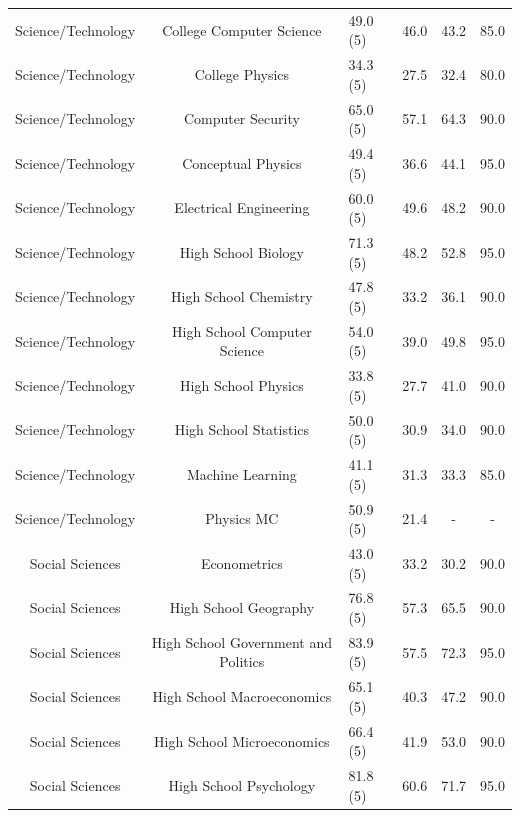 \documentclass[11pt, a4paper, logo, internal, copyright, nonumbering]{deepmind}
\begin{document}
\begin{center}
\begin{longtable}{cclccc}
     Science/Technology &             College Computer Science &   49.0 (5) &  46.0 &  43.2 &         85.0 \\
     Science/Technology &                      College Physics &   34.3 (5) &  27.5 &  32.4 &         80.0 \\
     Science/Technology &                    Computer Security &   65.0 (5) &  57.1 &  64.3 &         90.0 \\
     Science/Technology &                   Conceptual Physics &   49.4 (5) &  36.6 &  44.1 &         95.0 \\
     Science/Technology &               Electrical Engineering &   60.0 (5) &  49.6 &  48.2 &         90.0 \\
     Science/Technology &                  High School Biology &   71.3 (5) &  48.2 &  52.8 &         95.0 \\
     Science/Technology &                High School Chemistry &   47.8 (5) &  33.2 &  36.1 &         90.0 \\
     Science/Technology &         High School Computer Science &   54.0 (5) &  39.0 &  49.8 &         95.0 \\
     Science/Technology &                  High School Physics &   33.8 (5) &  27.7 &  41.0 &         90.0 \\
     Science/Technology &               High School Statistics &   50.0 (5) &  30.9 &  34.0 &         90.0 \\
     Science/Technology &                     Machine Learning &   41.1 (5) &  31.3 &  33.3 &         85.0 \\
     Science/Technology &                            Physics MC &   50.9 (5) &  21.4 &   - &          - \\
        Social Sciences &                         Econometrics &   43.0 (5) &  33.2 &  30.2 &         90.0 \\
        Social Sciences &                High School Geography &   76.8 (5) &  57.3 &  65.5 &         90.0 \\
        Social Sciences &  High School Government and Politics &   83.9 (5) &  57.5 &  72.3 &         95.0 \\
        Social Sciences &           High School Macroeconomics &   65.1 (5) &  40.3 &  47.2 &         90.0 \\
        Social Sciences &           High School Microeconomics &   66.4 (5) &  41.9 &  53.0 &         90.0 \\
        Social Sciences &               High School Psychology &   81.8 (5) &  60.6 &  71.7 &         95.0 \\

\end{longtable}
\end{center}
\end{document}
